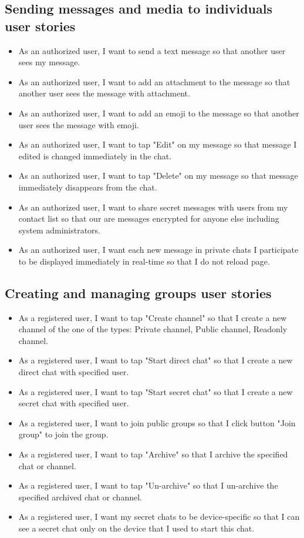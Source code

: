 \subsection{Sending messages and media to individuals user stories}
\label{subsec:sending-messages-and-media-feature-user-stories}
\begin{itemize}
    \item As an authorized user, I want to send a text message so that another user sees my message.
    \item As an authorized user, I want to add an attachment to the message so that another user sees the message with attachment.
    \item As an authorized user, I want to add an emoji to the message so that another user sees the message with emoji.
    \item As an authorized user, I want to tap "Edit" on my message so that message I edited is changed immediately in the chat.
    \item As an authorized user, I want to tap "Delete" on my message so that message immediately disappears from the chat.
    \item As an authorized user, I want to share secret messages with users from my contact list so that our are
    messages encrypted for anyone else including system administrators.
    \item As an authorized user, I want each new message in private chats I participate to be displayed immediately
    in real-time so that I do not reload page.
\end{itemize}

\subsection{Creating and managing groups user stories}\label{subsec:creating-groups-feature-user-stories}
\begin{itemize}
    \item As a registered user, I want to tap "Create channel" so that I create a new channel of the one of the types:
    Private channel, Public channel, Readonly channel.
    \item As a registered user, I want to tap "Start direct chat" so that I create a new direct chat with specified user.
    \item As a registered user, I want to tap "Start secret chat" so that I create a new secret chat with specified user.
    \item As a registered user, I want to join public groups so that I click button "Join group" to join the group.
    \item As a registered user, I want to tap "Archive" so that I archive the specified chat or channel.
    \item As a registered user, I want to tap "Un-archive" so that I un-archive the specified archived chat or channel.
    \item As a registered user, I want my secret chats to be device-specific so that I can see a secret chat only
    on the device that I used to start this chat.
\end{itemize}

